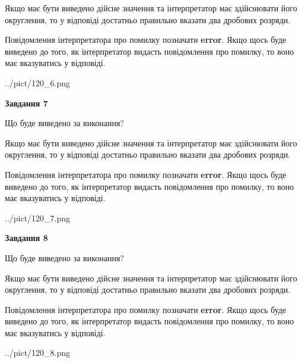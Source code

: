 \documentclass[12pt, ukrainian]{article}
\begin{document}
{\begin {Large}
Якщо має бути виведено дійсне значення та інтерпретатор має здійснювати його округлення, 
то у відповіді достатньо правильно вказати два дробових розряди.

Повідомлення інтерпретатора про помилку позначати \textbf{error}.
Якщо щось буде виведено до того, як інтерпретатор видасть повідомлення про помилку, 
то воно має вказуватись у відповіді. \par

\begin{center}
	{../pict/120_6.png}
\end{center}
\newpage

{\begin {center}\textbf{Завдання 7}\end {center}}\par
Що буде виведено за виконання? \par

Якщо має бути виведено дійсне значення та інтерпретатор має здійснювати його округлення, 
то у відповіді достатньо правильно вказати два дробових розряди.

Повідомлення інтерпретатора про помилку позначати \textbf{error}.
Якщо щось буде виведено до того, як інтерпретатор видасть повідомлення про помилку, 
то воно має вказуватись у відповіді. \par

\begin{center}
	{../pict/120_7.png}
\end{center}
\newpage

{\begin {center}\textbf{Завдання 8}\end {center}}\par
Що буде виведено за виконання? \par

Якщо має бути виведено дійсне значення та інтерпретатор має здійснювати його округлення, 
то у відповіді достатньо правильно вказати два дробових розряди.

Повідомлення інтерпретатора про помилку позначати \textbf{error}.
Якщо щось буде виведено до того, як інтерпретатор видасть повідомлення про помилку, 
то воно має вказуватись у відповіді. \par

\begin{center}
	{../pict/120_8.png}
\end{center}
\newpage


\end{Large}}
\end{document}
